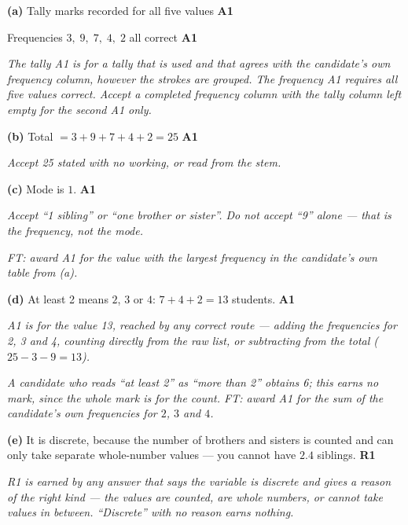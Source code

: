 \documentclass[12pt, twoside]{article}
\begin{document}
\begin{enumerate}[itemsep=0.3cm]
\textbf{(a)} Tally marks recorded for all five values \hfill \textbf{A1}

Frequencies $3,\; 9,\; 7,\; 4,\; 2$ all correct \hfill \textbf{A1}

\emph{The tally A1 is for a tally that is used and that agrees with the
candidate's own frequency column, however the strokes are grouped. The
frequency A1 requires all five values correct. Accept a completed
frequency column with the tally column left empty for the second A1 only.}

\textbf{(b)} Total $= 3 + 9 + 7 + 4 + 2 = 25$ \hfill \textbf{A1}

\emph{Accept 25 stated with no working, or read from the stem.}

\textbf{(c)} Mode is $1$. \hfill \textbf{A1}

\emph{Accept ``1 sibling'' or ``one brother or sister''. Do not accept
``9'' alone --- that is the frequency, not the mode.}

\emph{FT: award A1 for the value with the largest frequency in the
candidate's own table from (a).}

\textbf{(d)} At least 2 means $2$, $3$ or $4$: $7 + 4 + 2 = 13$ students.
\hfill \textbf{A1}

\emph{A1 is for the value 13, reached by any correct route --- adding the
frequencies for 2, 3 and 4, counting directly from the raw list, or
subtracting from the total ($25 - 3 - 9 = 13$).}

\emph{A candidate who reads ``at least 2'' as ``more than 2'' obtains 6;
this earns no mark, since the whole mark is for the count. FT: award A1
for the sum of the candidate's own frequencies for $2$, $3$ and $4$.}

\textbf{(e)} It is discrete, because the number of brothers and sisters
is counted and can only take separate whole-number values --- you cannot
have $2.4$ siblings. \hfill \textbf{R1}

\emph{R1 is earned by any answer that says the variable is discrete
\emph{and} gives a reason of the right kind --- the values are counted,
are whole numbers, or cannot take values in between. ``Discrete'' with no
reason earns nothing.}

\end{enumerate}
\end{document}

